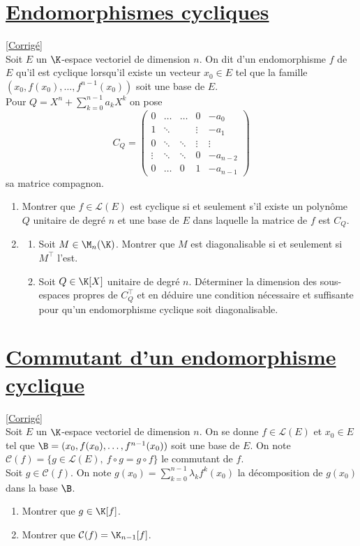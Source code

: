 \documentclass[8pt]{book}
\begin{document}
	\section{\underline{Endomorphismes cycliques} }
	\label{Endomorphismes cycliques}
	\textcolor{blue}{\hyperref[Endomorphismes cycliques corrigé]{[Corrigé]}}\\
	Soit $E$ un $\K$-espace vectoriel de dimension $n$. On dit d'un endomorphisme $f$ de $E$ qu'il est cyclique lorsqu'il existe un vecteur $x_0\in E$ tel que la famille $(x_0,f(x_0),\dots,f^{n-1}(x_0))$ soit une base de $E$.\\
	Pour $Q=X^n+\displaystyle\sum\limits_{k=0}^{n-1}{a_kX^k}$ on pose
	$$C_Q=\begin{pmatrix}
		0&\dots&\dots&0&-a_0\\
		1&\ddots&\ &\vdots&-a_1\\
		0&\ddots&\ddots&\vdots&\vdots\\
		\vdots&\ddots&\ddots&0&-a_{n-2}\\
		0&\dots&0&1&-a_{n-1}
	\end{pmatrix}$$
	sa matrice compagnon.
	\begin{enumerate}
		\item Montrer que $f\in \mathcal L(E)$ est cyclique si et seulement s'il existe un polynôme $Q$ unitaire de degré $n$ et une base de $E$ dans laquelle la matrice de $f$ est $C_Q$.
		\item \begin{enumerate}[label=\alph*.]
			\item Soit $M\in \M_n(\K)$. Montrer que $M$ est diagonalisable si et seulement si $M^\top$ l'est.
			\item Soit $Q\in \K[X]$ unitaire de degré $n$. Déterminer la dimension des sous-espaces propres de $C_Q^\top$ et en déduire une condition nécessaire et suffisante pour qu'un endomorphisme cyclique soit diagonalisable.
		\end{enumerate}
	\end{enumerate}
	
	\section{\underline{Commutant d'un endomorphisme cyclique} }
	\label{Commutant d'un endomorphisme cyclique}
	\textcolor{blue}{\hyperref[Commutant d'un endomorphisme cyclique corrigé]{[Corrigé]}}\\
	Soit $E$ un $\K$-espace vectoriel de dimension $n$. On se donne $f\in \mathcal{L}(E)$ et $x_0\in E$ tel que $\B=(x_0,f(x_0),\dots,f^{n-1}(x_0))$ soit une base de $E$. On note $\mathcal{C}(f)=\{g\in \mathcal{L}(E),\ f\circ g=g\circ f\}$ le commutant de $f$.\\
	Soit $g\in \mathcal{C}(f)$. On note $g(x_0)=\displaystyle\sum\limits_{k=0}^{n-1}{\lambda_kf^k(x_0)}$ la décomposition de $g(x_0)$ dans la base $\B$.
	\begin{enumerate}
		\item Montrer que $g\in \K[f]$.
		\item Montrer que $\mathcal{C}(f)=\K_{n-1}[f]$.
	\end{enumerate}
	
\end{document}
